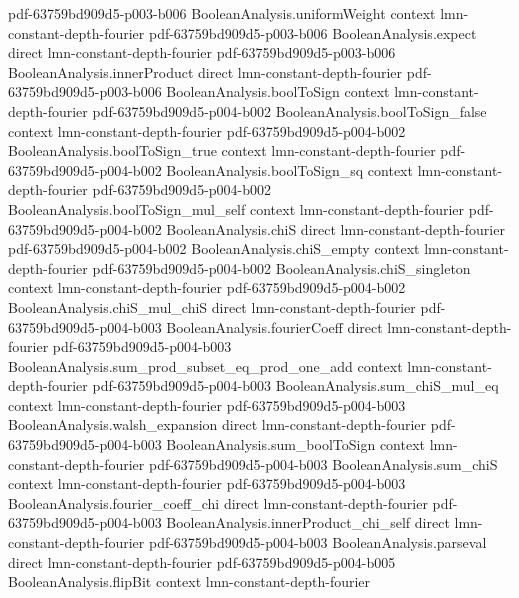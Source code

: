 \begin{lemma}
  {pdf-63759bd909d5-p003-b006}
\proofstep
  {BooleanAnalysis.uniformWeight}
  {context}
  {lmn-constant-depth-fourier}
  {pdf-63759bd909d5-p003-b006}
\proofstep
  {BooleanAnalysis.expect}
  {direct}
  {lmn-constant-depth-fourier}
  {pdf-63759bd909d5-p003-b006}
\proofstep
  {BooleanAnalysis.innerProduct}
  {direct}
  {lmn-constant-depth-fourier}
  {pdf-63759bd909d5-p003-b006}
\proofstep
  {BooleanAnalysis.boolToSign}
  {context}
  {lmn-constant-depth-fourier}
  {pdf-63759bd909d5-p004-b002}
\proofstep
  {BooleanAnalysis.boolToSign_false}
  {context}
  {lmn-constant-depth-fourier}
  {pdf-63759bd909d5-p004-b002}
\proofstep
  {BooleanAnalysis.boolToSign_true}
  {context}
  {lmn-constant-depth-fourier}
  {pdf-63759bd909d5-p004-b002}
\proofstep
  {BooleanAnalysis.boolToSign_sq}
  {context}
  {lmn-constant-depth-fourier}
  {pdf-63759bd909d5-p004-b002}
\proofstep
  {BooleanAnalysis.boolToSign_mul_self}
  {context}
  {lmn-constant-depth-fourier}
  {pdf-63759bd909d5-p004-b002}
\proofstep
  {BooleanAnalysis.chiS}
  {direct}
  {lmn-constant-depth-fourier}
  {pdf-63759bd909d5-p004-b002}
\proofstep
  {BooleanAnalysis.chiS_empty}
  {context}
  {lmn-constant-depth-fourier}
  {pdf-63759bd909d5-p004-b002}
\proofstep
  {BooleanAnalysis.chiS_singleton}
  {context}
  {lmn-constant-depth-fourier}
  {pdf-63759bd909d5-p004-b002}
\proofstep
  {BooleanAnalysis.chiS_mul_chiS}
  {direct}
  {lmn-constant-depth-fourier}
  {pdf-63759bd909d5-p004-b003}
\proofstep
  {BooleanAnalysis.fourierCoeff}
  {direct}
  {lmn-constant-depth-fourier}
  {pdf-63759bd909d5-p004-b003}
\proofstep
  {BooleanAnalysis.sum_prod_subset_eq_prod_one_add}
  {context}
  {lmn-constant-depth-fourier}
  {pdf-63759bd909d5-p004-b003}
\proofstep
  {BooleanAnalysis.sum_chiS_mul_eq}
  {context}
  {lmn-constant-depth-fourier}
  {pdf-63759bd909d5-p004-b003}
\proofstep
  {BooleanAnalysis.walsh_expansion}
  {direct}
  {lmn-constant-depth-fourier}
  {pdf-63759bd909d5-p004-b003}
\proofstep
  {BooleanAnalysis.sum_boolToSign}
  {context}
  {lmn-constant-depth-fourier}
  {pdf-63759bd909d5-p004-b003}
\proofstep
  {BooleanAnalysis.sum_chiS}
  {context}
  {lmn-constant-depth-fourier}
  {pdf-63759bd909d5-p004-b003}
\proofstep
  {BooleanAnalysis.fourier_coeff_chi}
  {direct}
  {lmn-constant-depth-fourier}
  {pdf-63759bd909d5-p004-b003}
\proofstep
  {BooleanAnalysis.innerProduct_chi_self}
  {direct}
  {lmn-constant-depth-fourier}
  {pdf-63759bd909d5-p004-b003}
\proofstep
  {BooleanAnalysis.parseval}
  {direct}
  {lmn-constant-depth-fourier}
  {pdf-63759bd909d5-p004-b005}
\proofstep
  {BooleanAnalysis.flipBit}
  {context}
  {lmn-constant-depth-fourier}

\end{lemma}
